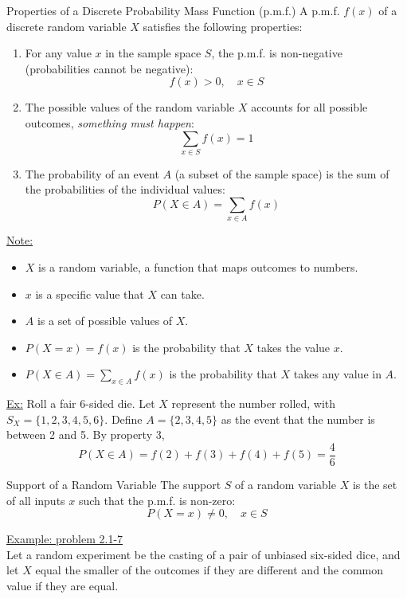 ﻿\documentclass[12pt]{article}
\begin{document}
\begin{theorem}{Properties of a Discrete Probability Mass Function (p.m.f.)}
A p.m.f. $f(x)$ of a discrete random variable $X$ satisfies the following properties:
\begin{enumerate}
    \item For any value $x$ in the sample space $S$, the p.m.f. is non-negative (probabilities cannot be negative):
    \[f(x) > 0,\quad x \in S\]
    \item The possible values of the random variable $X$ accounts for all possible outcomes, \textit{something must happen}: 
    \[\sum_{x \in S} f(x) = 1\]
    \item The probability of an event $A$ (a subset of the sample space) is the sum of the probabilities of the individual values:
    \[P(X \in A) = \sum_{x \in A} f(x)\]
\end{enumerate}
\underline{Note:}
\begin{itemize}
    \item $X$ is a random variable, a function that maps outcomes to numbers.
    \item $x$ is a specific value that $X$ can take.
    \item $A$ is a set of possible values of $X$.
    \item $P(X=x)=f(x)$ is the probability that $X$ takes the value $x$.
    \item $P(X\in A)=\sum_{x\in A}f(x)$ is the probability that $X$ takes any value in $A$.
\end{itemize}

\underline{Ex:} Roll a fair 6-sided die. Let $X$ represent the number rolled, with $S_X=\{1,2,3,4,5,6\}$. Define $A=\{2,3,4,5\}$ as the event that the number is between 2 and 5. By property 3,
\[P(X\in A)=f(2)+f(3)+f(4)+f(5)=\frac{4}{6}\]
\end{theorem}
\begin{definition}{Support of a Random Variable}
    The support $S$ of a random variable $X$ is the set of all inputs $x$ such that the p.m.f. is non-zero:
    \[P(X=x) \neq 0,\quad x \in S\]
\end{definition}
\underline{Example: problem 2.1-7}\\
Let a random experiment be the casting of a pair of unbiased six-sided dice, and let $X$ equal the smaller of the outcomes if they are different and the common value if they are equal.
\end{document}
